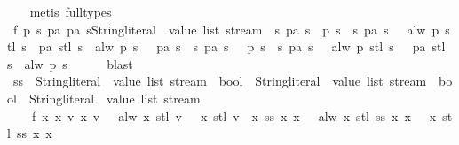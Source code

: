 \begin{isabellebody}
\ \ \isamarkupfalse%
\ {\isacharparenleft}metis\ {\isacharparenleft}full{\isacharunderscore}types{\isacharparenright}{\isacharparenright}\isanewline
\ \ \isamarkupfalse%
\ f{}{\isacharcolon}\ {\isachardoublequoteopen}{\isasymforall}p\ s\ pa{\isachardot}\ {\isacharparenleft}pa\ {\isacharparenleft}s{\isacharcolon}{\isacharcolon}{\isacharparenleft}String{\isachardot}literal\ {\isasymtimes}\ value\ list{\isacharparenright}\ stream{\isacharparenright}\ {\isasymand}\ {\isacharparenleft}{\isasymforall}s{\isachardot}\ pa\ s\ {\isasymlongrightarrow}\ p\ s{\isacharparenright}\ {\isasymand}\ {\isacharparenleft}{\isasymforall}s{\isachardot}\ pa\ s\ {\isasymand}\ {\isasymnot}\ alw\ p\ {\isacharparenleft}stl\ s{\isacharparenright}\ {\isasymlongrightarrow}\ pa\ {\isacharparenleft}stl\ s{\isacharparenright}{\isacharparenright}\ {\isasymlongrightarrow}\ alw\ p\ s{\isacharparenright}\ {\isacharequal}\ {\isacharparenleft}{\isacharparenleft}{\isasymnot}\ pa\ s\ {\isasymor}\ {\isacharparenleft}{\isasymexists}s{\isachardot}\ pa\ s\ {\isasymand}\ {\isasymnot}\ p\ s{\isacharparenright}\ {\isasymor}\ {\isacharparenleft}{\isasymexists}s{\isachardot}\ {\isacharparenleft}pa\ s\ {\isasymand}\ {\isasymnot}\ alw\ p\ {\isacharparenleft}stl\ s{\isacharparenright}{\isacharparenright}\ {\isasymand}\ {\isasymnot}\ pa\ {\isacharparenleft}stl\ s{\isacharparenright}{\isacharparenright}{\isacharparenright}\ {\isasymor}\ alw\ p\ s{\isacharparenright}{\isachardoublequoteclose}\isanewline
\ \ \ \ \isamarkupfalse%
\ blast\isanewline
\ \ \isamarkupfalse%
\ ss\ {\isacharcolon}{\isacharcolon}\ {\isachardoublequoteopen}{\isacharparenleft}{\isacharparenleft}String{\isachardot}literal\ {\isasymtimes}\ value\ list{\isacharparenright}\ stream\ {\isasymRightarrow}\ bool{\isacharparenright}\ {\isasymRightarrow}\ {\isacharparenleft}{\isacharparenleft}String{\isachardot}literal\ {\isasymtimes}\ value\ list{\isacharparenright}\ stream\ {\isasymRightarrow}\ bool{\isacharparenright}\ {\isasymRightarrow}\ {\isacharparenleft}String{\isachardot}literal\ {\isasymtimes}\ value\ list{\isacharparenright}\ stream{\isachardoublequoteclose}\ \isanewline
\ \ \ \ f{}{\isacharcolon}\ {\isachardoublequoteopen}{\isasymforall}x{}\ x{}{\isachardot}\ {\isacharparenleft}{\isasymexists}v{}{\isachardot}\ {\isacharparenleft}x{}\ v{}\ {\isasymand}\ {\isasymnot}\ alw\ x{}\ {\isacharparenleft}stl\ v{}{\isacharparenright}{\isacharparenright}\ {\isasymand}\ {\isasymnot}\ x{}\ {\isacharparenleft}stl\ v{}{\isacharparenright}{\isacharparenright}\ {\isacharequal}\ {\isacharparenleft}{\isacharparenleft}x{}\ {\isacharparenleft}ss\ x{}\ x{}{\isacharparenright}\ {\isasymand}\ {\isasymnot}\ alw\ x{}\ {\isacharparenleft}stl\ {\isacharparenleft}ss\ x{}\ x{}{\isacharparenright}{\isacharparenright}{\isacharparenright}\ {\isasymand}\ {\isasymnot}\ x{}\ {\isacharparenleft}stl\ {\isacharparenleft}ss\ x{}\ x{}{\isacharparenright}{\isacharparenright}{\isacharparenright}{\isachardoublequoteclose}\isanewline

\end{isabellebody}
